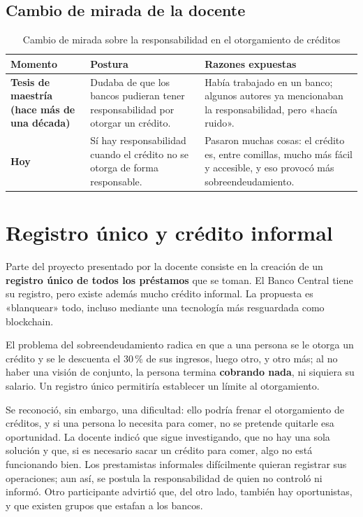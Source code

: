 \documentclass[12pt,oneside]{book}
\begin{document}
\subsection{Cambio de mirada de la docente}

\begin{table}[H]
\centering
\caption{Cambio de mirada sobre la responsabilidad en el otorgamiento de créditos}
\begin{tabularx}{\textwidth}{>{\raggedright\arraybackslash}p{}>{\raggedright\arraybackslash}X>{\raggedright\arraybackslash}X}
\toprule
\textbf{Momento} & \textbf{Postura} & \textbf{Razones expuestas} \\
\midrule
\textbf{Tesis de maestría (hace más de una década)} & Dudaba de que los bancos pudieran tener responsabilidad por otorgar un crédito. & Había trabajado en un banco; algunos autores ya mencionaban la responsabilidad, pero «hacía ruido». \\
\textbf{Hoy} & Sí hay responsabilidad cuando el crédito no se otorga de forma responsable. & Pasaron muchas cosas: el crédito es, entre comillas, mucho más fácil y accesible, y eso provocó más sobreendeudamiento. \\
\bottomrule
\end{tabularx}
\end{table}

\section{Registro único y crédito informal}

Parte del proyecto presentado por la docente consiste en la creación de un \textbf{registro único de todos los préstamos} que se toman. El Banco Central tiene su registro, pero existe además mucho crédito informal. La propuesta es «blanquear» todo, incluso mediante una tecnología más resguardada como blockchain.

El problema del sobreendeudamiento radica en que a una persona se le otorga un crédito y se le descuenta el 30\,\% de sus ingresos, luego otro, y otro más; al no haber una visión de conjunto, la persona termina \textbf{cobrando nada}, ni siquiera su salario. Un registro único permitiría establecer un límite al otorgamiento.

Se reconoció, sin embargo, una dificultad: ello podría frenar el otorgamiento de créditos, y si una persona lo necesita para comer, no se pretende quitarle esa oportunidad. La docente indicó que sigue investigando, que no hay una sola solución y que, si es necesario sacar un crédito para comer, algo no está funcionando bien. Los prestamistas informales difícilmente quieran registrar sus operaciones; aun así, se postula la responsabilidad de quien no controló ni informó. Otro participante advirtió que, del otro lado, también hay oportunistas, y que existen grupos que estafan a los bancos.
\end{document}
